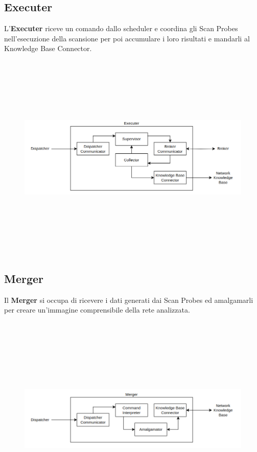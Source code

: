 \documentclass[target=bach,aauheader=,style=]{thud}
\begin{document}
\subsection{Executer} 
L'\textbf{Executer} riceve un comando dallo scheduler e coordina gli Scan Probes nell'esecuzione della scansione per poi accumulare i loro risultati e mandarli al Knowledge Base Connector.

\begin{figure}[h]
  \includegraphics[width=15cm, height=10cm]{executer}
\centering
\end{figure}

\subsection{Merger}
Il \textbf{Merger} si occupa di ricevere i dati generati dai Scan Probes ed amalgamarli per creare un'immagine comprensibile della rete analizzata. 


\begin{figure}[h]
  \includegraphics[width=15cm, height=10cm]{merger}
\centering
\end{figure}
\end{document}
